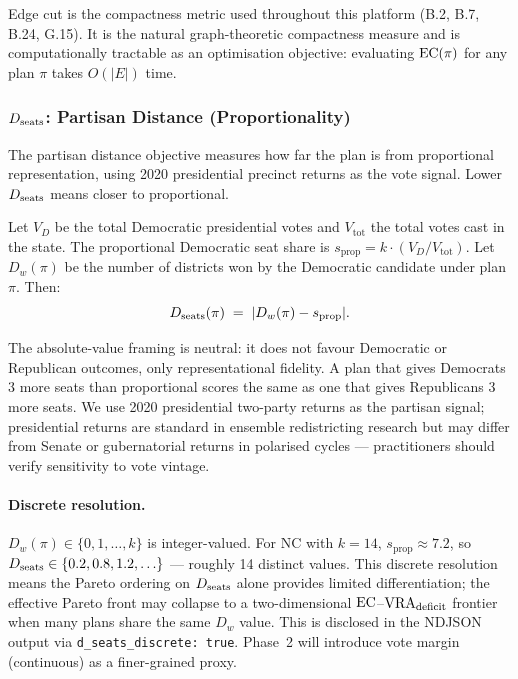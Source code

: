 Edge cut is the compactness metric used throughout this platform (B.2, B.7,
B.24, G.15).
It is the natural graph-theoretic compactness measure and is computationally
tractable as an optimisation objective: evaluating $\mathrm{EC}(\pi)$ for any plan
$\pi$ takes $O(|E|)$ time.

\subsubsection{$D_{\mathrm{seats}}$: Partisan Distance (Proportionality)}

The partisan distance objective measures how far the plan is from proportional
representation, using 2020 presidential precinct returns as the vote signal.
Lower $D_{\mathrm{seats}}$ means closer to proportional.

\begin{definition}
\label{def:dseats}
Let $V_D$ be the total Democratic presidential votes and $V_{\mathrm{tot}}$
the total votes cast in the state.
The proportional Democratic seat share is
$s_{\mathrm{prop}} = k \cdot (V_D / V_{\mathrm{tot}})$.
Let $D_w(\pi)$ be the number of districts won by the Democratic candidate
under plan $\pi$.
Then:
\[
  D_{\mathrm{seats}}(\pi) \;=\; |D_w(\pi) - s_{\mathrm{prop}}|.
\]
\end{definition}

The absolute-value framing is neutral: it does not favour Democratic or
Republican outcomes, only representational fidelity.
A plan that gives Democrats 3 more seats than proportional scores the same as
one that gives Republicans 3 more seats.
We use 2020 presidential two-party returns as the partisan signal; presidential returns are standard in ensemble redistricting research \citep{deford2021} but may differ from Senate or gubernatorial returns in polarised cycles --- practitioners should verify sensitivity to vote vintage.

\paragraph{Discrete resolution.}
$D_w(\pi) \in \{0, 1, \ldots, k\}$ is integer-valued.
For NC with $k=14$, $s_{\mathrm{prop}} \approx 7.2$, so
$D_{\mathrm{seats}} \in \{0.2, 0.8, 1.2, \ldots\}$ --- roughly 14 distinct values.
This discrete resolution means the Pareto ordering on $D_{\mathrm{seats}}$ alone
provides limited differentiation; the effective Pareto front may collapse
to a two-dimensional $\mathrm{EC}$--$\mathrm{VRA}_{\mathrm{deficit}}$ frontier when many plans share the same
$D_w$ value.
This is disclosed in the NDJSON output via \texttt{d\_seats\_discrete: true}.
Phase~2 will introduce vote margin (continuous) as a finer-grained proxy.

